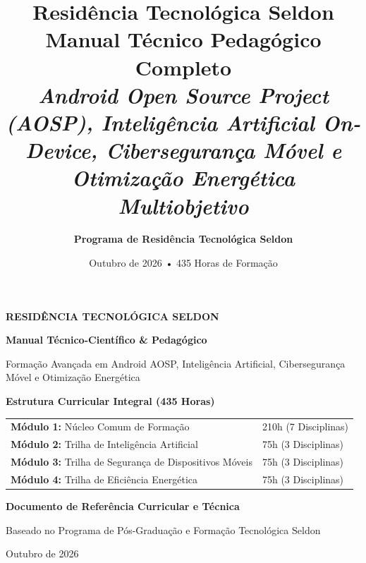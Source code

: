 \documentclass[11pt,a4paper,oneside]{report}
\title{
    \textbf{\Huge Residência Tecnológica Seldon}\\[0.5cm]
    \Large\textbf{Manual Técnico Pedagógico Completo}\\
    \large\textit{Android Open Source Project (AOSP), Inteligência Artificial On-Device, Cibersegurança Móvel e Otimização Energética Multiobjetivo}
}
\author{\textbf{Programa de Residência Tecnológica Seldon}}
\date{Outubro de 2026 • 435 Horas de Formação}
\begin{document}
\begin{titlepage}
    \centering
    \vspace*{1.5cm}
    {\Huge\textbf{\color{seldonDark}RESIDÊNCIA TECNOLÓGICA SELDON}\par}
    \vspace{0.8cm}
    {\Large\color{seldonCyan}\textbf{Manual Técnico-Científico \& Pedagógico}\par}
    \vspace{0.3cm}
    {\large Formação Avançada em Android AOSP, Inteligência Artificial, Cibersegurança Móvel e Otimização Energética\par}
    
    \vspace{2cm}
    \begin{tcolorbox}[colback=seldonDark, colframe=seldonCyan, arc=4mm, width=0.9\textwidth]
        \centering\color{white}
        \textbf{\large Estrutura Curricular Integral (435 Horas)}\\[0.3cm]
        \begin{tabular}{ll}
            \textbf{Módulo 1:} Núcleo Comum de Formação & 210h (7 Disciplinas)\\
            \textbf{Módulo 2:} Trilha de Inteligência Artificial & 75h (3 Disciplinas)\\
            \textbf{Módulo 3:} Trilha de Segurança de Dispositivos Móveis & 75h (3 Disciplinas)\\
            \textbf{Módulo 4:} Trilha de Eficiência Energética & 75h (3 Disciplinas)\\
        \end{tabular}
    \end{tcolorbox}

    \vfill
    {\large\textbf{Documento de Referência Curricular e Técnica}\par}
    {\small Baseado no Programa de Pós-Graduação e Formação Tecnológica Seldon\par}
    \vspace{1cm}
    {\large Outubro de 2026\par}
\end{titlepage}

\tableofcontents
\newpage












\end{document}
